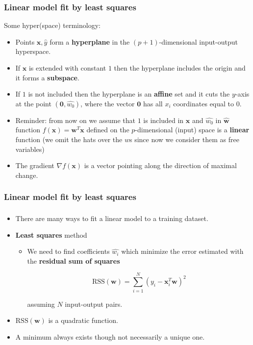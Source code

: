 \documentclass[notes]{beamer}          %
\newcommand{\vect}[1]{\bm{#1}}
\begin{document}
\begin{frame}
\frametitle{Linear model fit by least squares}
    Some hyper(space) terminology:
    \begin{itemize}
        \item Points $\vect{x},\hat{y}$ form a {\bf hyperplane} in the $(p+1)$-dimensional input-output hyperspace.
        \item If $\vect{x}$ is extended with constant $1$ then the hyperplane includes the origin and it forms a {\bf subspace}.
        \item If $1$ is not included then the hyperplane is an {\bf affine} set and it cuts the $y$-axis at the point $(\vect{0}, \hat{w_0})$, where the vector $\vect{0}$ has all $x_i$ coordinates equal to $0$.
        \item Reminder: from now on we assume that $1$ is included in $\vect{x}$ and $\hat{w_0}$ in $\hat{\vect{w}}$
        \ietm function $f(\vect{x}) =  \vect{w}^T \vect{x}$ defined on the $p$-dimensional (input) space is a {\bf linear} function (we omit the hats over the $w$s since now we consider them as free variables)
        \item The gradient $\nabla f(\vect{x})$ is a vector pointing along the direction of maximal change.
    \end{itemize}

\end{frame}


\begin{frame}
\frametitle{Linear model fit by least squares}
\frametitle{}
    \begin{itemize}
        \item There are many ways to fit a linear model to a training dataset.
        \item {\bf Least squares} method
            \begin{itemize}
                \item We need to find coefficients $\hat{w_i}$ which minimize the error estimated with the {\bf residual sum of squares}
                \begin{center}
                    $$\mbox{RSS}(\vect{w}) = \sum_{i = 1}^{N}(y_i - \vect{x}_i^T \vect{w})^2$$
                \end{center}
                 assuming $N$ input-output pairs.
            \end{itemize}
        \item $\mbox{RSS}(\vect{w})$ is a quadratic function.
        \item A minimum always exists though not necessarily a unique one.
    \end{itemize}

\end{frame}
\end{document}

